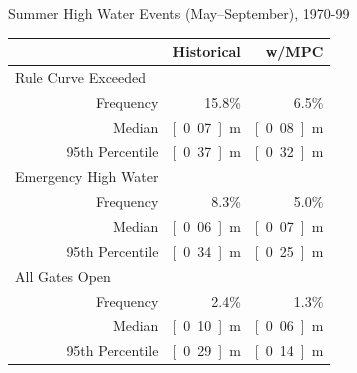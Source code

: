 \documentclass[compress,english]{beamer}
\begin{document}
\begin{frame}{Summer High Water Events (May--September), 1970-99}

\begin{center}
\begin{tabular}{lrrr}\toprule
\qquad\qquad\qquad\quad & & Historical & w/MPC	\\
\midrule
\multicolumn{2}{l}{Rule Curve Exceeded} & & \\
& Frequency & 15.8\% & 6.5\% \\
& Median & \unit[0.07]{m} & \unit[0.08]{m}\\
& 95th Percentile & \unit[0.37]{m} & \unit[0.32]{m}\\
\midrule
\multicolumn{2}{l}{Emergency High Water} & & \\
& Frequency & 8.3\% & 5.0\%\\
& Median & \unit[0.06]{m} & \unit[0.07]{m} \\
& 95th Percentile & \unit[0.34]{m} & \unit[0.25]{m} \\
\midrule
\multicolumn{2}{l}{All Gates Open} & &\\
& Frequency & 2.4\% & 1.3\% \\
& Median & \unit[0.10]{m} & \unit[0.06]{m}\\
& 95th Percentile & \unit[0.29]{m} & \unit[0.14]{m} \\
\midrule
\end{tabular}
\end{center}

\vspace*{3mm}
\vfill

\end{frame}
\end{document}
